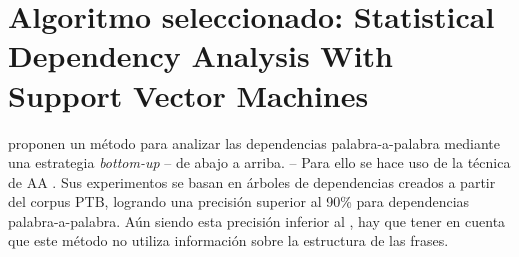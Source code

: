 \chapter{Algoritmo seleccionado: Statistical Dependency Analysis With Support
  Vector Machines}
\label{ch:algorithm}

\citeauthor{yamada2003} \cite{yamada2003} proponen un método para analizar las
dependencias palabra-a-palabra mediante una estrategia \emph{bottom-up} -- de
abajo a arriba. -- Para ello se hace uso de la técnica de \ac{AA}
. Sus experimentos se basan en árboles de dependencias creados a
partir del corpus \ac{PTB}, logrando una precisión superior al 90\% para
dependencias palabra-a-palabra. Aún siendo esta precisión inferior al
, hay que tener en cuenta que este método no utiliza
información sobre la estructura de las frases.

